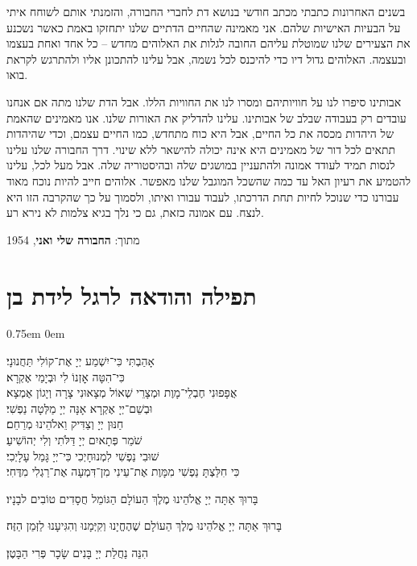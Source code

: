 \documentclass[14pt, article, extrafontsizes, twopage, a4paper]{memoir}
\newcommand{\attr}[1]{
  \vspace*{.25\baselineskip}
  {\raggedright\smaller#1


  }
}
\begin{document}
{בשנים האחרונות כתבתי מכתב חודשי בנושא דת לחברי החבורה, והזמנתי אותם לשוחח איתי על הבעיות האישיות שלהם. אני מאמינה שהחיים הדתיים שלנו יתחזקו באמת כאשר נשכנע את הצעירים שלנו שמוטלת עליהם החובה לגלות את האלוהים מחדש – כל אחד ואחת בעצמו ובעצמה. האלוהים גדול דיו כדי להיכנס לכל נשמה, אבל עלינו להתכונן אליו ולהתרגש לקראת בואו.

אבותינו סיפרו לנו על חוויותיהם ומסרו לנו את החוויות הללו. אבל הדת שלנו מתה אם אנחנו עובדים רק בעבודה שבלב של אבותינו. עלינו להדליק את האורות שלנו. אנו מאמינים שהאמת של היהדות מכסה את כל החיים, אבל היא כוח מתחדש, כמו החיים עצמם, וכדי שהיהדות תתאים לכל דור של מאמינים היא אינה יכולה להישאר ללא שינוי. דרך החבורה שלנו עלינו לנסות תמיד לעודד אמונה ולהתעניין במושגים שלה ובהיסטוריה שלה. אבל מעל לכל, עלינו להטמיע את רעיון האל עד כמה שהשכל המוגבל שלנו מאפשר. אלוהים חייב להיות נוכח מאוד עבורנו כדי שנוכל לחיות תחת הדרכתו, לעבוד עבורו ואיתו, ולסמוך על כך שהקרבה הזו היא לנצח. עם אמונה כזאת, גם כי נלך בגיא צלמות לא נירא רע.

\attr{מתוך: \textbf{החבורה שלי ואני}, 1954}

}
\pagebreak
\chapter{תפילה והודאה לרגל לידת בן}
\parskip 0.75em
\parindent 0em


אָהַבְתִּי כִּי־יִשְׁמַע יְיָ אֶת־קוֹלִי תַּחֲנוּנָי׃\\
כִּי־הִטָּה אׇזְנוֹ לִי וּבְיָמַי אֶקְרָא׃\\
אֲפָפוּנִי חֶבְלֵי־מָוֶת וּמְצָרֵי שְׁאוֹל מְצָאוּנִי צָרָה וְיָגוֹן אֶמְצָא׃\\
וּבְשֵׁם־יְיָ אֶקְרָא אָנָּה יְיָ מַלְּטָה נַפְשִׁי׃\\
חַנּוּן יְיָ וְצַדִּיק וֵאלֹהֵינוּ מְרַחֵם׃\\
שֹׁמֵר פְּתָאיִם יְיָ דַּלֹּתִי וְלִי יְהוֹשִׁיעַ׃\\
שׁוּבִי נַפְשִׁי לִמְנוּחָיְכִי כִּי־יְיָ גָּמַל עָלָיְכִי׃\\
כִּי חִלַּצְתָּ נַפְשִׁי מִמָּוֶת אֶת־עֵינִי מִן־דִּמְעָה אֶת־רַגְלִי מִדֶּחִי׃

{\larger
בָּרוּךְ אַתָּה יְיָ אֱלֹהֵינוּ מֶלֶךְ הַעוֹלָם הַגּוֹמֵל חֲסָדִים טוֹבִים לבָנָיו׃

בָּרוּךְ אַתָּה יְיָ אֱלֹהֵינוּ מֶלֶךְ הַעוֹלָם שֶׁהֶחֱיָנוּ וְקִיְּמָנוּ וְהִגִּיעָנוּ לַזְּמַן הַזֶּה׃
}

הִנֵּה נַחֲלַת יְיָ בָּנִים שָׂכָר פְּרִי הַבָּטֶן׃
\end{document}
